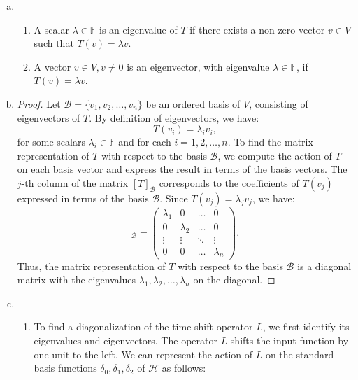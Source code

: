\documentclass{article}
\begin{document}
\begin{enumerate}[(a)]
    \item 
    \begin{enumerate}[1.]
        \item A scalar $\lambda \in \mathbb{F}$ is an eigenvalue of $T$ if there exists a non-zero vector $v \in V$ such that $T(v) = \lambda v$.
        \item A vector $v \in V, v \neq 0$ is an eigenvector, with eigenvalue $\lambda \in \mathbb{F}$, if $T(v) = \lambda v$.
    \end{enumerate}
    \item \begin{proof}
        Let $\mathscr{B} = \{ v_1, v_2, \ldots, v_n \}$ be an ordered basis of $V$, consisting of eigenvectors of $T$. By definition of eigenvectors, we have:
        \begin{equation*}
            T(v_i) = \lambda_i v_i,
        \end{equation*}
        for some scalars $\lambda_i \in \mathbb{F}$ and for each $i = 1, 2, \ldots, n$. To find the matrix representation of $T$ with respect to the basis $\mathscr{B}$, we compute the action of $T$ on each basis vector and express the result in terms of the basis vectors. The $j$-th column of the matrix $[T]_{\mathscr{B}}$ corresponds to the coefficients of $T(v_j)$ expressed in terms of the basis $\mathscr{B}$. Since $T(v_j) = \lambda_j v_j$, we have:
        \begin{equation*}
            [T]_{\mathscr{B}} = \begin{pmatrix}
                \lambda_1 & 0 & \ldots & 0 \\
                0 & \lambda_2 & \ldots & 0 \\
                \vdots & \vdots & \ddots & \vdots \\
                0 & 0 & \ldots & \lambda_n
            \end{pmatrix}.
        \end{equation*}
        Thus, the matrix representation of $T$ with respect to the basis $\mathscr{B}$ is a diagonal matrix with the eigenvalues $\lambda_1, \lambda_2, \ldots, \lambda_n$ on the diagonal.
    \end{proof}
    \item  
    \begin{enumerate}[1.]
        \item To find a diagonalization of the time shift operator $L$, we first identify its eigenvalues and eigenvectors. The operator $L$ shifts the input function by one unit to the left. We can represent the action of $L$ on the standard basis functions $\delta_0, \delta_1, \delta_2$ of $\mathscr{H}$ as follows:

\end{enumerate}
\end{enumerate}
\end{document}
